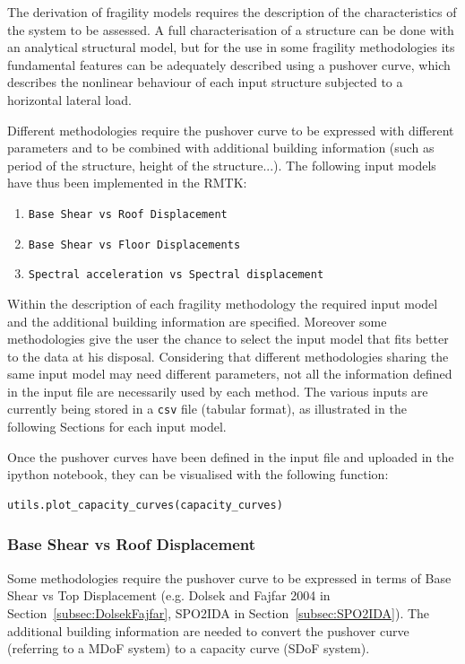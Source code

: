 The derivation of fragility models requires the description of the characteristics of the system to be assessed. A full characterisation of a structure can be done with an analytical structural model, but for the use in some fragility methodologies its fundamental features can be adequately described using a pushover curve, which describes the nonlinear behaviour of each input structure subjected to a horizontal lateral load.

Different methodologies require the pushover curve to be expressed with different parameters and to be combined with additional building information (such as period of the structure, height of the structure...). The following input models have thus been implemented in the RMTK:\\

\begin{enumerate}
 \item \verb=Base Shear vs Roof Displacement=
 \item \verb=Base Shear vs Floor Displacements=
 \item \verb=Spectral acceleration vs Spectral displacement=\\
\end{enumerate}

Within the description of each fragility methodology the required input model and the additional building information are specified. Moreover some methodologies give the user the chance to select the input model that fits better to the data at his disposal. Considering that different methodologies sharing the same input model may need different parameters, not all the information defined in the input file are necessarily used by each method. The various inputs are currently being stored in a \verb=csv= file (tabular format), as illustrated in the following Sections for each input model.

Once the pushover curves have been defined in the input file and uploaded in the ipython notebook, they can be visualised with the following function:

\begin{Verbatim}[frame=single, commandchars=\\\{\}, samepage=true]
utils.plot_capacity_curves(capacity_curves)
\end{Verbatim}


\subsubsection{Base Shear vs Roof Displacement}
\label{subsubsec:VB-Droof}
Some methodologies require the pushover curve to be expressed in terms of Base Shear vs Top Displacement (e.g. Dolsek and Fajfar 2004 in Section~\ref{subsec:DolsekFajfar}, SPO2IDA in Section~\ref{subsec:SPO2IDA}). The additional building information are needed to convert the pushover curve (referring to a MDoF system) to a capacity curve (SDoF system).\\

